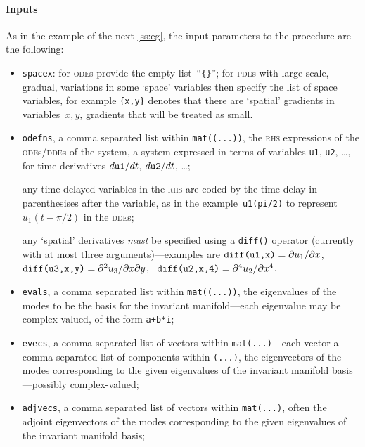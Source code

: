 \documentclass[11pt,a5paper]{article}
\begin{document}
\paragraph{Inputs}
As in the example of the next \cref{ss:eg}, the input
parameters to the procedure are the following:
\begin{itemize}

\item \verb|spacex|: for \textsc{ode}s provide the empty
list~``\verb|{}|''; for \textsc{pde}s with large-scale,
gradual, variations in some `space' variables then specify
the list of space variables, for example \verb|{x,y}|
denotes that there are `spatial' gradients in
variables~\(x,y\), gradients that will be treated as small.

\item \verb|odefns|, a comma separated list within
\verb|mat((...))|, the \textsc{rhs} expressions of the
\textsc{ode}s/\textsc{dde}s of the system, a system
expressed in terms of variables \verb|u1|, \verb|u2|,
\ldots, for time derivatives \(\de t{\tt u1}\), \(\de t{\tt
u2}\), \ldots;

any time delayed variables in the \textsc{rhs} are coded by
the time-delay in parenthesises after the variable, as in
the example~\verb|u1(pi/2)| to represent~\(u_1(t-\pi/2)\) in
the \textsc{dde}s;

any `spatial' derivatives \emph{must} be specified using a
\verb|diff()| operator (currently with at most three
arguments)---examples are \(\verb|diff(u1,x)|=\D x{u_1}\),
\  \(\verb|diff(u3,x,y)|=\Dx xy{u_3}\),
\  \(\verb|diff(u2,x,4)|=\Dn x4{u_2}\).


\item \verb|evals|, a comma separated list within
\verb|mat((...))|, the eigenvalues of the modes to be the
basis for the invariant manifold---each eigenvalue may be
complex-valued, of the form \verb|a+b*i|;

\item \verb|evecs|, a comma separated list of vectors within
\verb|mat(...)|---each vector a comma separated list of
components within \verb|(...)|, the eigenvectors of the
modes corresponding to the given eigenvalues of the
invariant manifold basis---possibly complex-valued;

\item \verb|adjvecs|, a comma separated list of vectors
within \verb|mat(...)|, often the adjoint eigenvectors of
the modes corresponding to the given eigenvalues of the
invariant manifold basis;  


\end{itemize}
\end{document}
